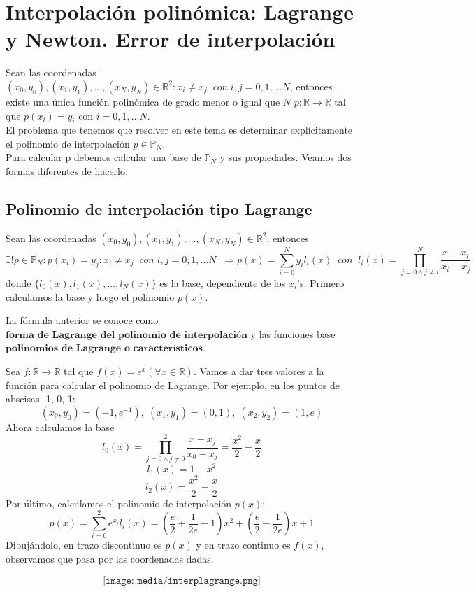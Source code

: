 \section{Interpolación polinómica: Lagrange y Newton. Error de interpolación}
Sean las coordenadas $(x_0,y_0), (x_1,y_1),...,(x_N,y_N) \in \mathbb{R}^2 : x_i \neq x_j \; \; con \; i,j = 0,1,...N$, entonces existe una única función polinómica de grado menor o igual que $N$ $p : \mathbb{R} \longrightarrow \mathbb{R}$ tal que $p(x_i) = y_i$ con $i = 0,1,...N$.\\
El problema que tenemos que resolver en este tema es determinar explícitamente el polinomio de interpolación $p \in \mathbb{P} _N$.\\
Para calcular p debemos calcular una base de $\mathbb{P} _N$ y sus propiedades. Veamos dos formas diferentes de hacerlo.

\subsection{Polinomio de interpolación tipo Lagrange}
\begin{nth}
Sean las coordenadas $(x_0,y_0), (x_1,y_1),...,(x_N,y_N) \in \mathbb{R}^2$, entonces
\[ \exists ! p \in \mathbb{P} _N : p(x_i) = y_j : x_i \neq x_j \; \; con \; i,j = 0,1,...N \; \; \Rightarrow p(x) = \sum_{i=0}^N y_il_i(x) \; \; con \; \; l_i(x) = \prod_{j=0 \wedge j \neq i}^N \frac{x-x_j}{x_i-x_j} \]
donde $\lbrace l_0(x), l_1(x),...,l_N(x) \rbrace$ es la base, dependiente de los $x_i$'s. Primero calculamos la base y luego el polinomio $p(x)$.
\end{nth}

La fórmula anterior se conoce como $\textbf{forma de Lagrange del polinomio de
interpolación}$ y las funciones base $\textbf{polinomios de Lagrange o característicos}$.

\begin{ejemplo}
Sea $f: \mathbb{R} \longrightarrow \mathbb{R}$ tal que $f(x) = e^x ( \forall x \in \mathbb{R} )$. Vamos a dar tres valores a la función para calcular el polinomio de Lagrange. Por ejemplo, en los puntos de abscisas -1, 0, 1:
\[ (x_0, y_0) = (-1,e^{-1}), \; (x_1,y_1) = (0,1), \; (x_2,y_2) = (1,e) \]
Ahora calculamos la base
\[ l_0(x) = \prod_{j=0 \wedge j \neq 0}^2 \frac{x-x_j}{x_0-x_j} = \frac{x^2}{2} - \frac{x}{2} \]
\[ l_1(x) = 1 - x^2 \]
\[ l_2(x) = \frac{x^2}{2} + \frac{x}{2} \]
Por último, calculamos el polinomio  de interpolación $p(x)$:
\[ p(x) = \sum _{i=0}^2 e^{x_i}l_i(x) = \left( \frac{e}{2} + \frac{1}{2e} - 1 \right) x^2 + \left( \frac{e}{2} - \frac{1}{2e} \right) x + 1 \]
Dibujándolo, en trazo discontinuo es $p(x)$ y en trazo continuo es $f(x)$, observamos que pasa por las coordenadas dadas.

\[ \texttt{[image: media/interplagrange.png]} \]
\end{ejemplo}

